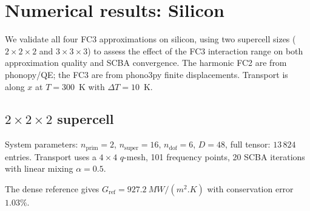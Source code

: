 \documentclass[11pt]{article}
\newcommand{\ndof}{n_{\mathrm{dof}}}
\newcommand{\nprim}{n_{\mathrm{prim}}}
\newcommand{\nsuper}{n_{\mathrm{super}}}
\begin{document}
%
%

\section{Numerical results: Silicon}
\label{sec:results}

We validate all four FC3 approximations on silicon, using two supercell
sizes ($2\times2\times2$ and $3\times3\times3$) to assess the effect
of the FC3 interaction range on both approximation quality and SCBA
convergence.  The harmonic FC2 are from phonopy/QE; the FC3 are from
phono3py finite displacements.  Transport is along $x$ at $T = 300$~K
with $\Delta T = 10$~K.

\subsection{$2\times2\times2$ supercell}
\label{sec:results_222}

System parameters: $\nprim = 2$, $\nsuper = 16$, $\ndof = 6$,
$D = 48$, full tensor: $13\,824$ entries.  Transport uses a
$4\times4$ $q$-mesh, 101 frequency points, 20 SCBA iterations with
linear mixing $\alpha = 0.5$.

The dense reference gives
$G_\mathrm{ref} = \SI{927.2}{MW/(m^2.K)}$ with conservation error
$1.03\%$.
\end{document}
